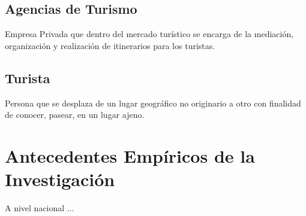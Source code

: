 			\subsection*{Agencias de Turismo}
			Empresa Privada que dentro del mercado turístico se encarga de la mediación, organización y realización de itinerarios para los turistas.
			\subsection*{Turista}
			Persona que se desplaza de un lugar geográfico no originario a otro con finalidad de conocer, pasear, en un lugar ajeno.
				
		\section{Antecedentes Empíricos de la Investigación}
		
		 A nivel nacional ...
		 
		